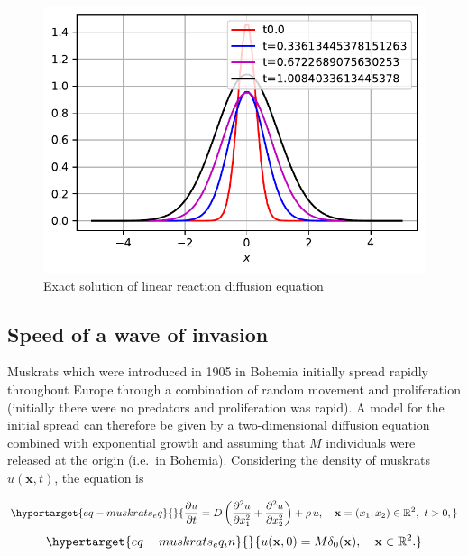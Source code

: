 \documentclass[
  letterpaper,
  DIV=11,
  numbers=noendperiod]{scrreprt}
\theoremstyle{definition}
\theoremstyle{plain}
\theoremstyle{plain}
\theoremstyle{remark}
\begin{document}
\begin{figure}

{\centering \includegraphics{linearreactiondiffusion_files/figure-pdf/fig-diffusionlinearsource-output-2.pdf}

}

\caption{\label{fig-diffusionlinearsource}Exact solution of linear
reaction diffusion equation}

\end{figure}

\hypertarget{speed-of-a-wave-of-invasion}{%
\subsection{Speed of a wave of
invasion}\label{speed-of-a-wave-of-invasion}}

Muskrats which were introduced in 1905 in Bohemia initially spread
rapidly throughout Europe through a combination of random movement and
proliferation (initially there were no predators and proliferation was
rapid). A model for the initial spread can therefore be given by a
two-dimensional diffusion equation combined with exponential growth and
assuming that \(M\) individuals were released at the origin (i.e.~in
Bohemia). Considering the density of muskrats \(u({\mathbf{x}} , t)\),
the equation is

\begin{equation}\protect\hypertarget{eq-muskrats_eq}{}{
\frac{\partial u}{\partial t} = D \left(\frac{\partial^2 u}{\partial x_1^2} +  \frac{\partial^2 u}{\partial x_2^2}\right)  + \rho \, u, \quad {\mathbf{x}} = (x_1 , x_2) \in \mathbb R^2, \, \, t >0, 
}\label{eq-muskrats_eq}\end{equation}
\begin{equation}\protect\hypertarget{eq-muskrats_eq_in}{}{
u({\mathbf{x}}, 0) = M \delta_0({\mathbf{x}}), \quad {\mathbf{x}} \in \mathbb R^2.
}\label{eq-muskrats_eq_in}\end{equation}
\end{document}

